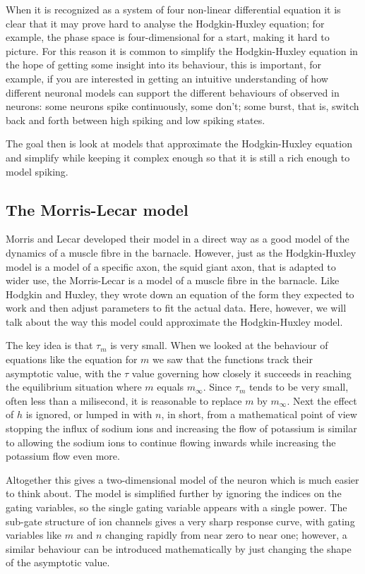 \documentclass[11pt,a4paper]{scrartcl}
\begin{document}
When it is recognized as a system of four non-linear differential
equation it is clear that it may prove hard to analyse the
Hodgkin-Huxley equation; for example, the phase space is
four-dimensional for a start, making it hard to picture. For this
reason it is common to simplify the Hodgkin-Huxley equation in the
hope of getting some insight into its behaviour, this is important,
for example, if you are interested in getting an intuitive
understanding of how different neuronal models can support the
different behaviours of observed in neurons: some neurons spike
continuously, some don't; some burst, that is, switch back and forth
between high spiking and low spiking states.

The goal then is look at models that approximate the Hodgkin-Huxley
equation and simplify while keeping it complex enough so that it is
still a rich enough to model spiking.

\subsection*{The Morris-Lecar model}


Morris and Lecar  \cite{MorrisLecar1981} developed their model in a direct way as a good model
of the dynamics of a muscle fibre in the barnacle.  However, just as
the Hodgkin-Huxley model is a model of a specific axon, the squid
giant axon, that is adapted to wider use, the Morris-Lecar is a model
of a muscle fibre in the barnacle. Like Hodgkin and Huxley, they wrote
down an equation of the form they expected to work and then adjust
parameters to fit the actual data. Here, however, we will talk about
the way this model could approximate the Hodgkin-Huxley model.

The key idea is that $\tau_m$ is very small. When we looked at the
behaviour of equations like the equation for $m$ we saw that the
functions track their asymptotic value, with the $\tau$ value
governing how closely it succeeds in reaching the equilibrium
situation where $m$ equals $m_\infty$. Since $\tau_m$ tends to be very
small, often less than a milisecond, it is reasonable to replace $m$
by $m_\infty$. Next the effect of $h$ is ignored, or lumped in with
$n$, in short, from a mathematical point of view stopping the influx
of sodium ions and increasing the flow of potassium is similar to
allowing the sodium ions to continue flowing inwards while increasing
the potassium flow even more.

Altogether this gives a two-dimensional model of the neuron which is
much easier to think about.  The model is simplified further by
ignoring the indices on the gating variables, so the single gating
variable appears with a single power. The sub-gate structure of ion
channels gives a very sharp response curve, with gating variables like
$m$ and $n$ changing rapidly from near zero to near one; however, a
similar behaviour can be introduced mathematically by just changing
the shape of the asymptotic value.
\end{document}

